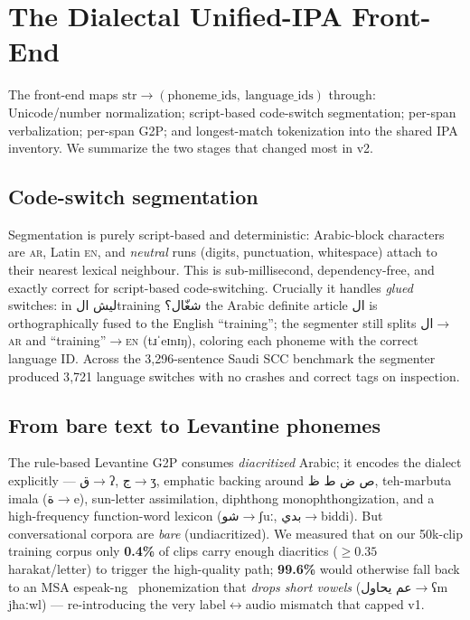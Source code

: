 \documentclass[10pt,twocolumn]{article}
\newcommand{\ipa}[1]{{\ipafont #1}}
\newcommand{\ar}[1]{{\arabicfont #1}}
\newcommand{\best}[1]{\textbf{#1}}
\begin{document}
\section{The Dialectal Unified-IPA Front-End}
\label{sec:frontend}
The front-end maps \(\text{str}\rightarrow(\text{phoneme\_ids},\ \text{language\_ids})\)
through: Unicode/number normalization; script-based code-switch segmentation; per-span
verbalization; per-span G2P; and longest-match tokenization into the shared IPA inventory.
We summarize the two stages that changed most in v2.

\subsection{Code-switch segmentation}
Segmentation is purely script-based and deterministic: Arabic-block characters are
\textsc{ar}, Latin \textsc{en}, and \emph{neutral} runs (digits, punctuation, whitespace)
attach to their nearest lexical neighbour. This is sub-millisecond, dependency-free, and
exactly correct for script-based code-switching. Crucially it handles \emph{glued}
switches: in \ar{ليش الtraining شغّال؟} the Arabic definite article \ar{ال} is orthographically
fused to the English ``training''; the segmenter still splits \ar{ال}\(\rightarrow\)\textsc{ar}
and ``training''\(\rightarrow\)\textsc{en} (\ipa{tɹˈeɪnɪŋ}), coloring each phoneme with the
correct language ID. Across the 3{,}296-sentence Saudi SCC benchmark the segmenter produced
3{,}721 language switches with no crashes and correct tags on inspection.

\subsection{From bare text to Levantine phonemes}
The rule-based Levantine G2P consumes \emph{diacritized} Arabic; it encodes the dialect
explicitly --- \ar{ق}\(\rightarrow\)\ipa{ʔ}, \ar{ج}\(\rightarrow\)\ipa{ʒ}, emphatic backing
around \ar{ص ض ط ظ}, teh-marbuta imala (\ar{ة}\(\rightarrow\)\ipa{e}), sun-letter
assimilation, diphthong monophthongization, and a high-frequency function-word lexicon
(\ar{شو}\(\rightarrow\)\ipa{ʃuː}, \ar{بدي}\(\rightarrow\)\ipa{biddi}). But conversational
corpora are \emph{bare} (undiacritized). We measured that on our 50k-clip training corpus
only \best{0.4\%} of clips carry enough diacritics (\(\geq\!0.35\) harakat/letter) to trigger
the high-quality path; \best{99.6\%} would otherwise fall back to an MSA
espeak-ng~\cite{espeak} phonemization that \emph{drops short vowels}
(\ar{عم يحاول}\(\rightarrow\)\ipa{ʕm jħaːwl}) --- re-introducing the very label\(\leftrightarrow\)audio
mismatch that capped v1.
\end{document}
